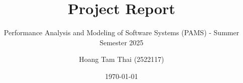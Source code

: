 \documentclass[
	english,
	accentcolor=9c,
	type=intern,
	marginpar=false,
	11pt
]{tudapub}
\begin{document}
\title{Project Report}
\subtitle{Performance Analysis and Modeling of Software Systems (PAMS) - Summer Semester 2025 \\}
\author{Hoang Tam Thai (2522117)}
\date{\today}

\maketitle
\tableofcontents
\clearpage





\end{document}
